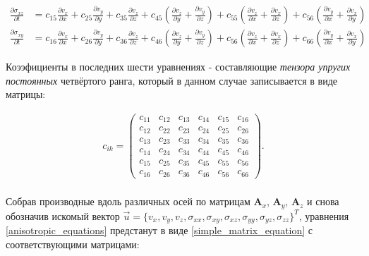 \begin{small}
\begin{align}
	\nonumber\\
	\frac{\partial{\sigma_{xz}}}{\partial{t}}&=c_{15}\frac{\partial{v_x}}{\partial{x}}+c_{25}\frac{\partial{v_y}}{\partial{y}}+c_{35}\frac{\partial{v_z}}{\partial{z}}+c_{45}(\frac{\partial{v_z}}{\partial{y}}+\frac{\partial{v_y}}{\partial{z}})+c_{55}(\frac{\partial{v_z}}{\partial{x}}+\frac{\partial{v_x}}{\partial{z}})+c_{56}(\frac{\partial{v_y}}{\partial{x}}+\frac{\partial{v_x}}{\partial{y}})
	\nonumber\\
	\frac{\partial{\sigma_{xy}}}{\partial{t}}&=c_{16}\frac{\partial{v_x}}{\partial{x}}+c_{26}\frac{\partial{v_y}}{\partial{y}}+c_{36}\frac{\partial{v_z}}{\partial{z}}+c_{46}(\frac{\partial{v_z}}{\partial{y}}+\frac{\partial{v_y}}{\partial{z}})+c_{56}(\frac{\partial{v_z}}{\partial{x}}+\frac{\partial{v_x}}{\partial{z}})+c_{66}(\frac{\partial{v_y}}{\partial{x}}+\frac{\partial{v_x}}{\partial{y}})
\end{align}
\end{small}
	
	Коээфициенты в последних шести уравнениях - составляющие \textit{тензора упругих постоянных} четвёртого ранга, который в данном случае записывается в виде матрицы:

\begin{align}
\label{anisotropic_tensor}	
c_{ik} =
\left( \begin{array}{cccccccccccc}
c_{11} & c_{12} & c_{13} & c_{14} & c_{15} & c_{16} \\ 
c_{12} & c_{22} & c_{23} & c_{24} & c_{25} & c_{26} \\ 
c_{13} & c_{23} & c_{33} & c_{34} & c_{35} & c_{36} \\ 
c_{14} & c_{24} & c_{34} & c_{44} & c_{45} & c_{46} \\ 
c_{15} & c_{25} & c_{35} & c_{45} & c_{55} & c_{56} \\ 
c_{16} & c_{26} & c_{36} & c_{46} & c_{56} & c_{66}
\end{array} \right).
\end{align}\\
	
	Собрав производные вдоль различных осей по матрицам $\mathbf{A}_x$, $\mathbf{A}_y$, $\mathbf{A}_z$ и снова обозначив искомый вектор $\vec{u}=\{v_x,v_y,v_z,\sigma_{xx},\sigma_{xy},\sigma_{xz},\sigma_{yy},\sigma_{yz},\sigma_{zz}\}^T$, уравнения \eqref{anisotropic_equations} предстанут в виде \eqref{simple_matrix_equation} с соответствующими матрицами:
	

